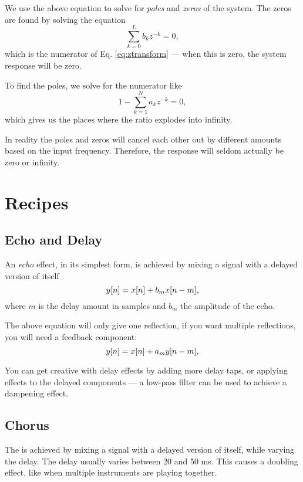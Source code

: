 \documentclass[11pt]{article}
\let\originalleft\left
\let\originalright\right
\renewcommand{\left}{\mathopen{}\mathclose\bgroup\originalleft}
\renewcommand{\right}{\aftergroup\egroup\originalright}
\def\lsqb{\left[}
\def\rsqb{\right]}
\def\sqb#1{\lsqb #1 \rsqb}
\def\ysig{y\sqb{n}}
\begin{document}
We use the above equation to solve for \textit{poles} and \textit{zeros} of the system. The zeros are found by solving the equation
\begin{equation}
    \sum_{k=0}^L b_k z^{-k} = 0,
\end{equation}
which is the numerator of Eq. \ref{eq:ztransform} --- when this is zero, the system response will be zero.

To find the poles, we solve for the numerator like
\begin{equation}
    1 - \sum_{k=1}^N a_k z^{-k} = 0,
\end{equation}
which gives us the places where the ratio explodes into infinity.

In reality the poles and zeros will cancel each other out by different amounts based on the input frequency. Therefore, the response will seldom actually be zero or infinity.

\section{Recipes}
\subsection{Echo and Delay}
An \textit{echo} effect, in its simplest form, is achieved by mixing a signal with a delayed version of itself
\begin{equation}
	\ysig = x\sqb{n} + b_m x\sqb{n - m},
\end{equation}
where $m$ is the delay amount in samples and $b_m$ the amplitude of the echo.

The above equation will only give one reflection, if you want multiple reflections, you will need a feedback component:
\begin{equation}
	\ysig = x\sqb{n} + a_m y\sqb{n - m},
\end{equation}

You can get creative with delay effects by adding more delay taps, or applying effects to the delayed components --- a low-pass filter can be used to achieve a dampening effect.

\subsection{Chorus}
The  is achieved by mixing a signal with a delayed version of itself, while varying the delay. The delay usually varies between 20 and 50 ms. This causes a doubling effect, like when multiple instruments are playing together.
\end{document}

